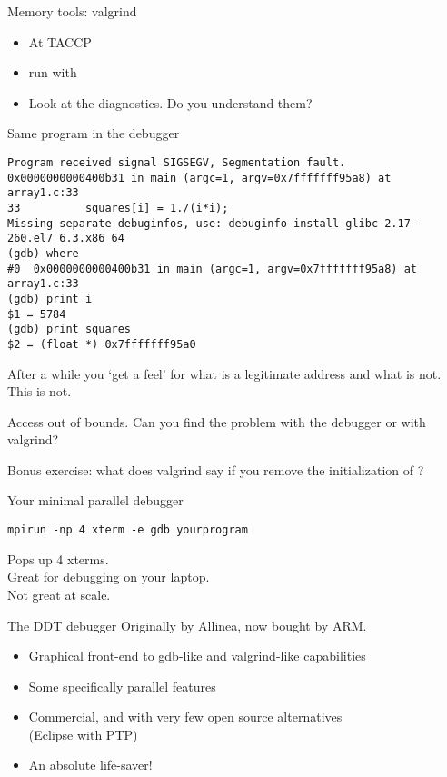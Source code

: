 \documentclass[11pt,headernav]{beamer}
\begin{document}
\begin{frame}[containsverbatim]{Memory tools: valgrind}
  \begin{itemize}
  \item At TACCP 
  \item run with 
  \item Look at the diagnostics. Do you understand them?
  \end{itemize}
\end{frame}

\begin{frame}[containsverbatim]{Same program in the debugger}
  \small
\begin{verbatim}
Program received signal SIGSEGV, Segmentation fault.
0x0000000000400b31 in main (argc=1, argv=0x7fffffff95a8) at array1.c:33
33          squares[i] = 1./(i*i);
Missing separate debuginfos, use: debuginfo-install glibc-2.17-260.el7_6.3.x86_64
(gdb) where
#0  0x0000000000400b31 in main (argc=1, argv=0x7fffffff95a8) at array1.c:33
(gdb) print i
$1 = 5784
(gdb) print squares
$2 = (float *) 0x7fffffff95a0
\end{verbatim}
After a while you `get a feel' for what is a legitimate address
and what is not. This is not.
\end{frame}

\begin{exerciseframe}[array2]
  Access out of bounds.
  Can you find the problem with the debugger or with valgrind?

  Bonus exercise: what does valgrind say if you remove the 
  initialization of ?
\end{exerciseframe}


\begin{frame}[containsverbatim]{Your minimal parallel debugger}
\begin{verbatim}
mpirun -np 4 xterm -e gdb yourprogram
\end{verbatim}
Pops up 4 xterms.\\
Great for debugging on your laptop.\\
Not great at scale.
\end{frame}

\begin{frame}{The DDT debugger}
  Originally by Allinea, now bought by ARM.
  \begin{itemize}
  \item Graphical front-end to gdb-like and valgrind-like capabilities
  \item Some specifically parallel features
  \item Commercial, and with very few open source alternatives\\
    (Eclipse with PTP)
  \item An absolute life-saver!
  \end{itemize}
\end{frame}
\end{document}
